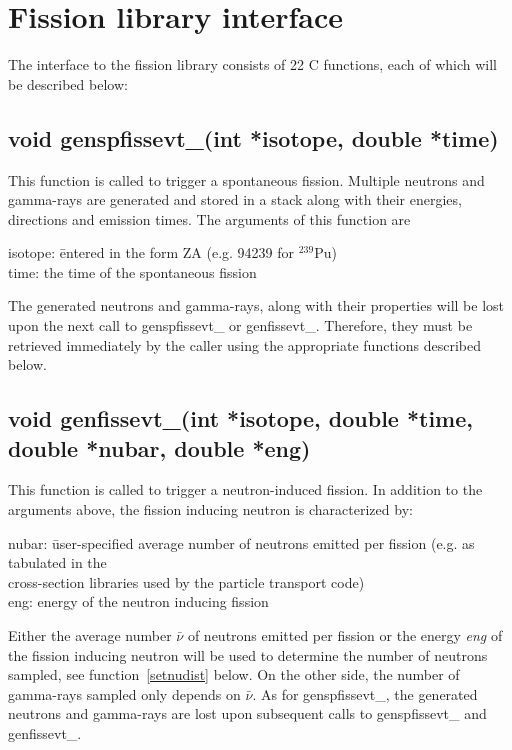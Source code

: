 \documentclass[fleqn,11pt]{article}
\begin{document}
\pagebreak
\section{Fission library interface}

The interface to the fission library consists of 
22 C functions, each of which will be described below:

\subsection{void genspfissevt\_(int *isotope, double *time)}
This function is called to trigger a spontaneous fission.
Multiple neutrons and gamma-rays are generated and stored
in a stack along with their energies, directions and 
emission times. The arguments of this function are

\begin{tabbing}
\indent isotope: \=entered in the form ZA (e.g. 94239 for $^{239}$Pu) \\
\indent time: \> the time of the spontaneous fission \\
\end{tabbing}

The generated neutrons and gamma-rays, along with their properties 
will be lost upon the next call to genspfissevt\_ or
genfissevt\_. Therefore, they must be retrieved immediately
by the caller using the appropriate functions described below.

\subsection{void genfissevt\_(int *isotope, double *time, double *nubar, double *eng)}
This function is called to trigger a neutron-induced fission.
In addition to the arguments above, the fission inducing neutron
is characterized by:

\begin{tabbing}
\indent nubar: \= user-specified average number of neutrons emitted 
per fission (e.g. as tabulated in the \\ 
\> cross-section libraries used by the particle transport code) \\
\indent eng: \> energy of the neutron inducing fission \\
\end{tabbing}

Either the average number $\bar{\nu}$ of neutrons emitted per 
fission or the energy \textit{eng} of the fission inducing 
neutron will be used to determine the number of neutrons sampled, 
see function~\ref{setnudist} below. On the other side, the number 
of gamma-rays sampled only depends on $\bar{\nu}$. As for 
genspfissevt\_, the generated neutrons and gamma-rays are lost upon 
subsequent calls to genspfissevt\_ and genfissevt\_.
\end{document}

